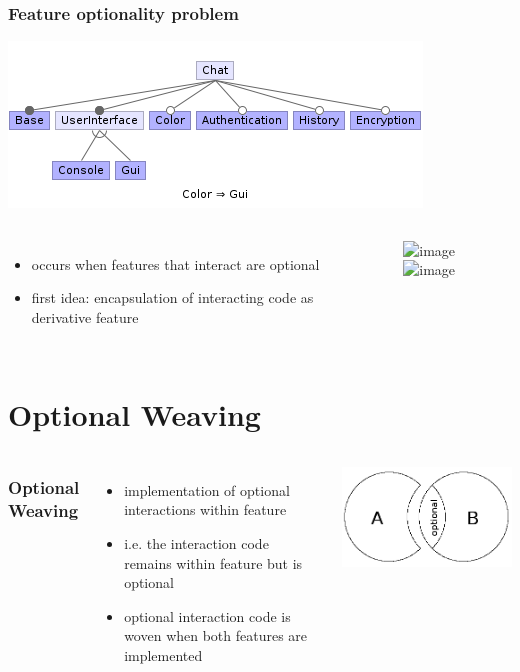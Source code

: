 \documentclass{beamer}
\begin{document}
\begin{frame}
\frametitle{Feature optionality problem}
\begin{center}
\includegraphics[width=.8\textwidth]{img/fm.png}
\end{center}
\pause
\begin{columns}
\begin{itemize}
 \item<1-> occurs when features that interact are optional 
\item<3-> first idea: encapsulation of interacting code as derivative feature 
\end{itemize}
\begin{center}
\begin{figure}
\includegraphics<1-2>[width=.6\textwidth]{img/fop.png}
\includegraphics<3>[width=.6\textwidth]{img/der.png}
\end{figure}
\end{center}
\end{columns}
\end{frame}

\section{Optional Weaving}

\begin{frame}
\begin{columns}
\frametitle{Optional Weaving}
\begin{itemize}
 \item implementation of optional interactions within feature
 \item i.e. the interaction code remains within feature but is optional 
 \item optional interaction code is woven when both features are implemented
\end{itemize}
\includegraphics[width=.9\textwidth]{img/ow.png}
\end{columns}
\end{frame}
\end{document}
